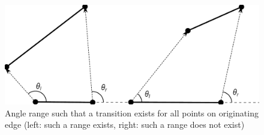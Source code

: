 \documentclass[]{styles/svproc}  %
\begin{document}
%
%


\begin{figure}
    \centering
    \includegraphics[width=0.7\linewidth]{figures/bouncerange_min.pdf}
    \caption{Angle range such that a transition exists for all points on
originating edge (left: such a range exists, right: such a range does not
exist)}
\label{fig:bounce_range}
\end{figure}
\end{document}
